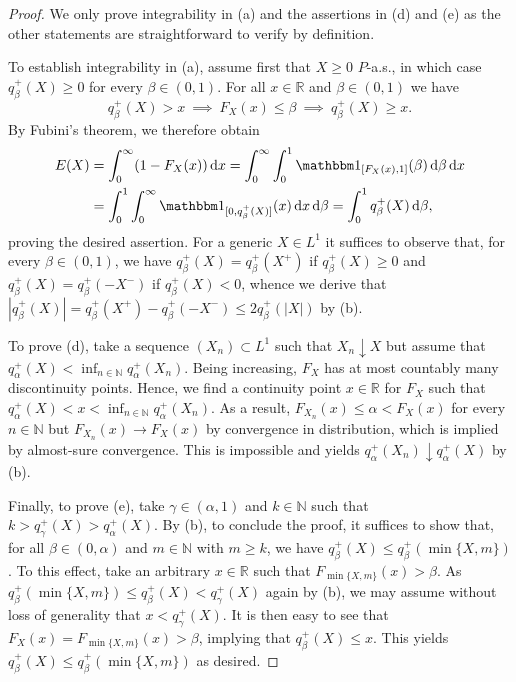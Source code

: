 \documentclass[12pt]{article}
\theoremstyle{plain}
\theoremstyle{definition}
\theoremstyle{remark}
\numberwithin{equation}{section}
\newcommand{\E}{E}
\newcommand{\probp}{P}
\newcommand{\R}{\mathbb{R}}
\newcommand{\N}{\mathbb{N}}
\newcommand{\ind}{\mathbbm 1}
\newcommand{\dd}{\,\mathrm{d}}
\begin{document}
\begin{proof}
We only prove integrability in (a) and the assertions in (d) and (e) as the other statements are straightforward to verify by definition.

To establish integrability in (a), assume first that $X\ge0$ $\probp$-a.s., in which case $q^+_\beta(X)\ge0$ for every $\beta\in(0,1)$. For all $x\in\R$ and $\beta\in(0,1)$ we have
\[
q^+_\beta(X)>x \ \implies \ F_X(x)\le \beta \ \implies \ q^+_\beta(X)\ge x.
\]
By Fubini's theorem, we therefore obtain
\begin{align*}
\E(X) &= \int_0^\infty(1-F_X(x))\dd x = \int_0^\infty\int_0^1\ind_{[F_X(x),1]}(\beta)\dd \beta \dd x \\
&= \int_0^1\int_0^\infty\ind_{[0,q^+_\beta(X)]}(x) \dd x \dd \beta = \int_0^1q^+_\beta(X) \dd \beta,
\end{align*}
proving the desired assertion. For a generic $X\in L^1$ it suffices to observe that, for every $\beta\in(0,1)$, we have $q^+_\beta(X)=q^+_\beta(X^+)$ if $q^+_\beta(X)\ge0$ and $q^+_\beta(X)=q^+_\beta(-X^-)$ if $q^+_\beta(X)<0$, whence we derive that $|q^+_\beta(X)|=q^+_\beta(X^+)-q^+_\beta(-X^-)\le 2q^+_\beta(|X|)$ by (b).

To prove (d), take a sequence $(X_n)\subset L^1$ such that $X_n\downarrow X$ but assume that $q^+_\alpha(X)<\inf_{n\in\N}q^+_\alpha(X_n)$. Being increasing, $F_X$ has at most countably many discontinuity points. Hence, we find a continuity point $x\in\R$ for $F_X$ such that $q^+_\alpha(X)<x<\inf_{n\in\N}q^+_\alpha(X_n)$. As a result, $F_{X_n}(x)\le \alpha<F_X(x)$ for every $n\in\N$ but $F_{X_n}(x)\to F_X(x)$ by convergence in distribution, which is implied by almost-sure convergence. This is impossible and yields $q^+_\alpha(X_n)\downarrow q^+_\alpha(X)$ by (b).

Finally, to prove (e), take $\gamma\in(\alpha,1)$ and $k\in\N$ such that $k>q^+_\gamma(X)>q^+_\alpha(X)$. By (b), to conclude the proof, it suffices to show that, for all $\beta\in(0,\alpha)$ and $m\in\N$ with $m\ge k$, we have $q^+_\beta(X)\le q^+_\beta(\min\{X,m\})$. To this effect, take an arbitrary $x\in\R$ such that $F_{\min\{X,m\}}(x)>\beta$. As $q^+_\beta(\min\{X,m\})\le q^+_\beta(X)<q^+_\gamma(X)$ again by (b), we may assume without loss of generality that $x<q^+_\gamma(X)$. It is then easy to see that $F_X(x)=F_{\min\{X,m\}}(x)>\beta$, implying that $q^+_\beta(X)\le x$. This yields $q^+_\beta(X)\le q^+_\beta(\min\{X,m\})$ as desired.
\end{proof}
\end{document}
